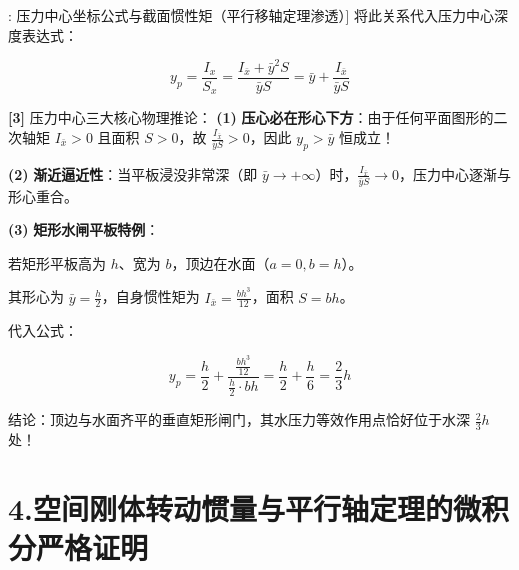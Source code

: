 \documentclass[11pt,a4paper,UTF8]{ctexart}
\begin{document}
\begin{thmbox}[模型[5]: 压力中心坐标公式与截面惯性矩（平行移轴定理渗透）]
将此关系代入压力中心深度表达式：


\begin{equation*}
y_p = \frac{I_x}{S_x} = \frac{I_{\bar{x}} + \bar{y}^2 S}{\bar{y} S} = \bar{y} + \frac{I_{\bar{x}}}{\bar{y} S}
\end{equation*}


\textbf{[3]} 压力中心三大核心物理推论：
\textbf{(1)}  \textbf{压心必在形心下方}：由于任何平面图形的二次轴矩 $I_{\bar{x}} > 0$ 且面积 $S > 0$，故 $\frac{I_{\bar{x}}}{\bar{y} S} > 0$，因此 $y_p > \bar{y}$ 恒成立！

\textbf{(2)}  \textbf{渐近逼近性}：当平板浸没非常深（即 $\bar{y} \to +\infty$）时，$\frac{I_{\bar{x}}}{\bar{y} S} \to 0$，压力中心逐渐与形心重合。

\textbf{(3)}  \textbf{矩形水闸平板特例}：

若矩形平板高为 $h$、宽为 $b$，顶边在水面（$a = 0, b = h$）。

其形心为 $\bar{y} = \frac{h}{2}$，自身惯性矩为 $I_{\bar{x}} = \frac{b h^3}{12}$，面积 $S = b h$。

代入公式：


\begin{equation*}
y_p = \frac{h}{2} + \frac{\frac{b h^3}{12}}{\frac{h}{2} \cdot b h} = \frac{h}{2} + \frac{h}{6} = \frac{2}{3}h
\end{equation*}


结论：\textit{}顶边与水面齐平的垂直矩形闸门，其水压力等效作用点恰好位于水深 $\frac{2}{3}h$ 处！\textit{}

\end{thmbox}

\section{4.空间刚体转动惯量与平行轴定理的微积分严格证明}
\end{document}
